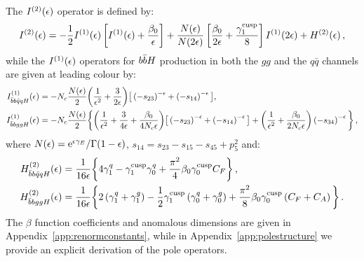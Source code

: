 \documentclass[main.tex]{subfiles}
\begin{document}
The $I^{(2)}(\epsilon)$ operator is defined by:
\begin{equation}
I^{(2)}(\epsilon) =   - \frac{1}{2}I^{(1)}(\epsilon) \left[ I^{(1)}(\epsilon)
              + \frac{\beta_0}{\epsilon} \right]
              + \frac{N(\epsilon)}{N(2\epsilon)} \left[ \frac{\beta_0}{2\epsilon}
                        + \frac{\gamma_{1}^{{\mathrm{cusp}}}}{8} \right] I^{(1)}(2\epsilon)
              + H^{(2)}(\epsilon) \,,
\end{equation}
while the $I^{(1)}(\epsilon)$ operators for $b\bar{b}H$ production in both the $gg$ and the $q\bar{q}$ channels are given at leading colour by:
\begin{align}
I_{\bar{b}b\bar{q}qH}^{(1)}(\epsilon) &= -N_c \frac{N(\epsilon)}{2} \bigg( \frac{1}{\epsilon^2} + \frac{3}{2\epsilon} \bigg) \big[ \left(-s_{23}\right)^{-\epsilon} + \left(-s_{14}\right)^{-\epsilon} \big], 
\label{eq:I1bbqqh}\\
I_{\bar{b}bggH}^{(1)}(\epsilon) &= -N_c \frac{N(\epsilon)}{2} \bigg\lbrace \bigg( \frac{1}{\epsilon^2} + \frac{3}{4\epsilon} + \frac{\beta_0}{4 N_c\epsilon} \bigg) \big[ \left(-s_{23}\right)^{-\epsilon} + \left(-s_{14}\right)^{-\epsilon} \big]
                 + \bigg( \frac{1}{\epsilon^2} + \frac{\beta_0}{2 N_c \epsilon} \bigg) \left(-s_{34}\right)^{-\epsilon} \bigg\rbrace \,,
\label{eq:I1bbggh}
\end{align}
where $N(\epsilon) = {\mathrm{e}^{\epsilon \gamma_E}}/{\Gamma(1-\epsilon)}$, $s_{14} = s_{23}-s_{15}-s_{45}+p_5^2$ and:
\begin{align}
H_{\bar{b}b\bar{q}qH}^{(2)}(\epsilon) &= \frac{1}{16\epsilon} \bigg\lbrace 4 \gamma_1^q - \gamma_1^{\mathrm{cusp}} \gamma_0^q + \frac{\pi^2}{4} \beta_0 \gamma_0^{\mathrm{cusp}} C_F \bigg\rbrace \,, \label{eq:H2bbqqH} \\
H_{\bar{b}bggH}^{(2)}(\epsilon) &=  \frac{1}{16\epsilon} \bigg\lbrace 2\left(\gamma_1^q+\gamma_1^g\right)
                                                - \frac{1}{2}\gamma_1^{\mathrm{cusp}} \left(\gamma_0^q+\gamma_0^g\right)
                                                + \frac{\pi^2}{8} \beta_0 \gamma_0^{\mathrm{cusp}} \left(C_F+C_A\right) \bigg\rbrace \,. \label{eq:H2bbggH}
\end{align}
The $\beta$ function coefficients and anomalous dimensions are given in Appendix~\ref{app:renormconstants}, while in Appendix~\ref{app:polestructure} we provide an explicit derivation of the pole operators.
\end{document}
